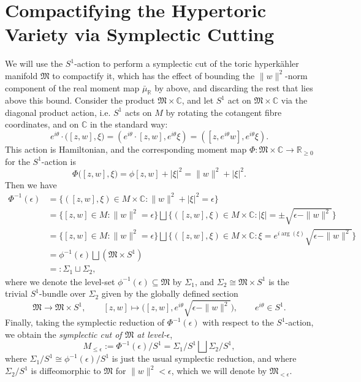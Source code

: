 \documentclass{article}
\newcommand{\st}{\ensuremath{:}}%
\newcommand{\ra}{\rightarrow}
\newcommand{\lbracket}{\left(}
\newcommand{\rbracket}{\right)}
\newcommand{\e}{\epsilon}
\newcommand{\HK}{hyperk\"ahler }
\newcommand{\RR}{\mathbb{R}}
\newcommand{\CC}{\mathbb{C}}
\newcommand{\mf}[1]{\mathfrak{#1}}
\begin{document}
	\section{Compactifying the Hypertoric Variety via Symplectic Cutting}
	
	We will use the $S^{1}$-action to perform a symplectic cut of the toric \HK manifold $\mf{M}$ to compactify it, which has the effect of bounding the $\|w\|^{2}$-norm component of the real moment map $\bar{\mu}_{\RR}$ by above, and discarding the rest that lies above this bound. Consider the product $\mf{M} \times \CC$,  and let $S^{1}$ act on $\mf{M} \times \CC$ via the diagonal product action, i.e. $S^{1}$ acts on $M$ by rotating the cotangent fibre coordinates, and on $\CC$ in the standard way:
	$$
	e^{i\theta} \cdot \big( [z,w], \xi   \big) = \left( e^{i\theta} \cdot [z,w], e^{i\theta}\xi\right) = \left( [z,e^{i\theta}w], e^{i\theta}\xi\right).
	$$
	This action is Hamiltonian, and the corresponding moment map $\Phi : \mf{M} \times \CC \ra \RR_{\geq 0}$ for the $S^{1}$-action is
	\[
		\Phi\big( [z,w], \xi  \big) = \phi[z,w] + |\xi|^{2} = \|w\|^{2} + |\xi|^{2}.
	\]
	Then we have
	\begin{equation*}
		\begin{split}
			\Phi^{-1}(\e) &= \big\{ ([z,w],\xi) \in M \times \CC \st \|w\|^{2} + |\xi|^{2} = \e    \big\} \\
			&= \big\{ [z,w] \in M \st \|w\|^{2} = \e    \big\} \bigsqcup \big\{ ([z,w],\xi) \in M \times \CC \st |\xi| = \pm\sqrt{\e - \|w\|^{2}} \big\} \\
			&= \big\{ [z,w] \in M \st \|w\|^{2} = \e    \big\} \bigsqcup \big\{ ([z,w],\xi) \in M \times \CC \st \xi = e^{i\arg(\xi)}\sqrt{\e - \|w\|^{2}}    \big\} \\
			&= \phi^{-1}(\e) \bigsqcup \lbracket \mf{M} \times S^{1}\rbracket \\
			&=: \Sigma_{1} \sqcup \Sigma_{2},
		\end{split}
	\end{equation*}
	where we denote the level-set $\phi^{-1}(\e) \subseteq \mf{M}$ by $\Sigma_{1}$, and $\Sigma_{2} \cong \mf{M} \times S^{1}$ is the trivial $S^{1}$-bundle over $\Sigma_{2}$ given by the globally defined section
	\begin{equation*}
		\mf{M} \rightarrow \mf{M} \times S^{1}, \qquad [z,w] \longmapsto \big( [z,w], e^{i\theta}\sqrt{\e - \|w\|^{2}}\big), \qquad e^{i\theta} \in S^{1}.
	\end{equation*}
	Finally, taking the symplectic reduction of $\Phi^{-1}(\e)$ with respect to the $S^{1}$-action, we obtain the \emph{symplectic cut of $\mf{M}$ at level-$\e$},
	\begin{equation*}
		M_{\leq \e} := \Phi^{-1}(\e)/S^{1} = \Sigma_{1}/S^{1} \bigsqcup \Sigma_{2}/S^{1},
	\end{equation*}
	where $\Sigma_{1}/S^{1} \cong \phi^{-1}(\e)/S^{1}$ is just the usual symplectic reduction, and where $\Sigma_{2}/S^{1}$ is diffeomorphic to $\mf{M}$ for $\|w\|^{2} < \e$, which we will denote by $\mf{M}_{<\epsilon}$.
	
\end{document}

